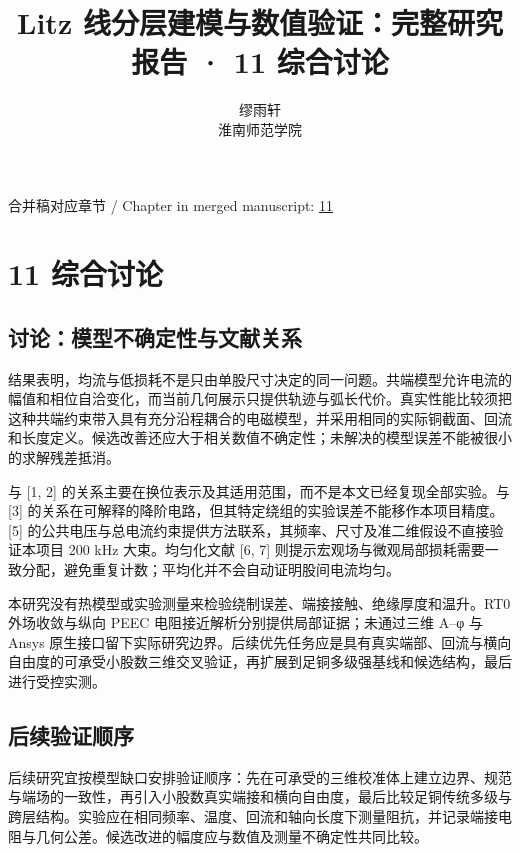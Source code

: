 \documentclass[11pt]{article}
\begin{document}
\title{Litz 线分层建模与数值验证：完整研究报告 · 11 综合讨论}
\author{缪雨轩\\淮南师范学院}
\date{}
\maketitle
\noindent 合并稿对应章节 / Chapter in merged manuscript: \href{report_zh-CN_single.pdf#chapter-11}{11}\par
\FloatBarrier
\section*{11 综合讨论}
\hypertarget{chapter-11}{}
\subsection*{讨论：模型不确定性与文献关系}
\hypertarget{11.discussion.heading}{}
结果表明，均流与低损耗不是只由单股尺寸决定的同一问题。共端模型允许电流的幅值和相位自洽变化，而当前几何展示只提供轨迹与弧长代价。真实性能比较须把这种共端约束带入具有充分沿程耦合的电磁模型，并采用相同的实际铜截面、回流和长度定义。候选改善还应大于相关数值不确定性；未解决的模型误差不能被很小的求解残差抵消。


与 [1, 2] 的关系主要在换位表示及其适用范围，而不是本文已经复现全部实验。与 [3] 的关系在可解释的降阶电路，但其特定绕组的实验误差不能移作本项目精度。[5] 的公共电压与总电流约束提供方法联系，其频率、尺寸及准二维假设不直接验证本项目 200 kHz 大束。均匀化文献 [6, 7] 则提示宏观场与微观局部损耗需要一致分配，避免重复计数；平均化并不会自动证明股间电流均匀。


本研究没有热模型或实验测量来检验绕制误差、端接接触、绝缘厚度和温升。RT0 外场收敛与纵向 PEEC 电阻接近解析分别提供局部证据；未通过三维 A–φ 与 Ansys 原生接口留下实际研究边界。后续优先任务应是具有真实端部、回流与横向自由度的可承受小股数三维交叉验证，再扩展到足铜多级强基线和候选结构，最后进行受控实测。


\subsection*{后续验证顺序}
\hypertarget{11.recommendations.heading}{}
后续研究宜按模型缺口安排验证顺序：先在可承受的三维校准体上建立边界、规范与端场的一致性，再引入小股数真实端接和横向自由度，最后比较足铜传统多级与跨层结构。实验应在相同频率、温度、回流和轴向长度下测量阻抗，并记录端接电阻与几何公差。候选改进的幅度应与数值及测量不确定性共同比较。
\end{document}
